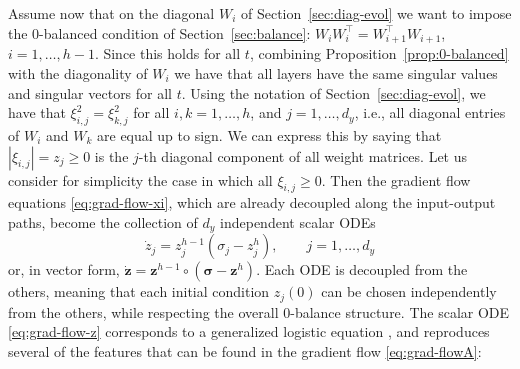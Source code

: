 \documentclass{article}
\newcommand{\1}{\mathds{1}}
\newcommand{\beq}{\begin{equation}}
\newcommand{\eeq}{\end{equation}}
\begin{document}
Assume now that on the diagonal $ W_i $ of Section~\ref{sec:diag-evol} we want to impose the 0-balanced condition of Section~\ref{sec:balance}: $ W_i W_i^\top = W_{i+1}^\top W_{i+1} $, $ i=1, \ldots, h-1$. Since this holds for all $t$, combining Proposition~\ref{prop:0-balanced} with the diagonality of $ W_i $ we have that all layers have the same singular values and singular vectors for all $t$.
Using the notation of Section~\ref{sec:diag-evol}, we have that $ \xi_{i,j} ^2 = \xi_{k,j}^2 $ for all $ i, k = 1, \ldots ,h$, and $ j=1,\ldots, d_y$, i.e., all diagonal entries of $ W_i $ and $ W_k $ are equal up to sign. We can express this by saying that  $ |\xi_{i,j} | = z_j \geq 0 $ is the $j$-th diagonal component of all weight matrices. 
Let us consider for simplicity the case in which all $ \xi_{i,j}\geq 0 $. Then the gradient flow equations \eqref{eq:grad-flow-xi}, which are already decoupled along the input-output paths, become the collection of $ d_y $ independent scalar ODEs
\beq
\dot z_j = z_j^{h-1} (\sigma_j - z_j^h ) , \qquad j=1, \ldots, d_y 
\label{eq:grad-flow-z}
\eeq
or, in vector form, $ \dot{\mathbf{z}} = \mathbf{z}^{h-1} \circ ( \bm{\sigma} - \mathbf{z}^h) $. 
Each ODE is decoupled from the others, meaning that each initial condition $ z_j(0)$ can be chosen independently from the others, while respecting the overall 0-balance structure.
The scalar ODE \eqref{eq:grad-flow-z} corresponds to a generalized logistic equation  \cite{blumberg1968logistic,tsoularis2002analysis}, and reproduces several of the features that can be found in the gradient flow \eqref{eq:grad-flowA}:
\end{document}
